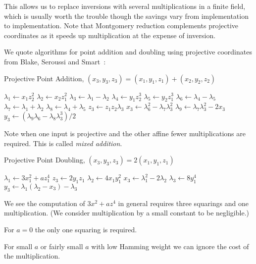 This allows us to replace inversions with several multiplications in a finite
field, which is usually worth the trouble though the savings
vary from implementation to implementation. Note that Montgomery reduction
complements projective coordinates as it speeds up multiplication at the
expense of inversion.

We quote algorithms for point addition and doubling using projective
coordinates from Blake, Seroussi and Smart~\cite{bss}:

\begin{algorithm}
\caption{Projective Point Addition, $(x_3, y_3, z_3) = (x_1, y_1, z_1) +
(x_2, y_2, z_2)$}
\begin{algorithmic}[1]
\STATE $\lambda_1 \gets x_1 z_2^2$
\STATE $\lambda_2 \gets x_2 z_1^2$
\STATE $\lambda_3 \gets \lambda_1 - \lambda_2$
\STATE $\lambda_4 \gets y_1 z_2^3$
\STATE $\lambda_5 \gets y_2 z_1^3$
\STATE $\lambda_6 \gets \lambda_4 - \lambda_5$
\STATE $\lambda_7 \gets \lambda_1 + \lambda_2$
\STATE $\lambda_8 \gets \lambda_4 + \lambda_5$
\STATE $z_3 \gets z_1 z_2 \lambda_3$
\STATE $x_3 \gets \lambda_6^2 - \lambda_7 \lambda_3^2$
\STATE $\lambda_9 \gets \lambda_7 \lambda_3^2 - 2x_3$
\STATE $y_3 \gets (\lambda_9 \lambda_6 - \lambda_8\lambda_3^3)/2$
\end{algorithmic}
\end{algorithm}

Note when one input is projective and the other affine fewer multiplications
are required. This is called \emph{mixed addition}.

\begin{algorithm}
\caption{Projective Point Doubling, $(x_3, y_3, z_3) = 2(x_1, y_1, z_1)$}
\begin{algorithmic}[1]
\STATE $\lambda_1 \gets 3x_1^2 +a z_1^4$
\STATE $z_3 \gets 2 y_1 z_1$
\STATE $\lambda_2 \gets 4x_1 y_1^2$
\STATE $x_3 \gets \lambda_1^2 - 2\lambda_2$
\STATE $\lambda_3 \gets 8y_1^4$
\STATE $y_3 \gets \lambda_1(\lambda_2 - x_3)-\lambda_3$
\end{algorithmic}
\end{algorithm}

We see the computation of $3x^2 + a z^4$ in general requires three
squarings and one multiplication. (We consider multiplication by
a small constant to be negligible.)

For $a=0$ the only one squaring is required.

For small $a$ or fairly small $a$ with low Hamming weight we can ignore
the cost of the multiplication.

